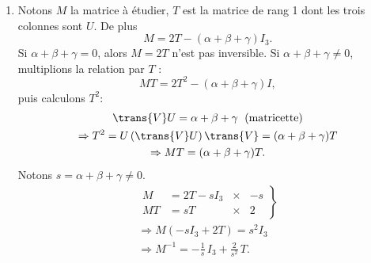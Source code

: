 \begin{enumerate}
 \item Notons $M$ la matrice à étudier, $T$ est la matrice de rang 1 dont les trois colonnes sont $U$. De plus
\[
M = 2 T - (\alpha + \beta + \gamma)I_3.
\]
Si $\alpha + \beta + \gamma =0$, alors $M = 2T$ n'est pas inversible.\newline
Si $\alpha + \beta + \gamma \neq 0$, multiplions la relation par $T$ :
\[
  MT =2T^2 -(\alpha + \beta + \gamma)I,
\]
puis calculons $T^2$:
\begin{multline*}
 \trans{V}U = \alpha + \beta + \gamma \; \text{ (matricette)}\\
 \Rightarrow
T^2 = U\left(\trans{V}U \right) \trans{V} = (\alpha + \beta + \gamma)T  \\
\Rightarrow MT = (\alpha + \beta + \gamma)T.
\end{multline*}
Notons $s=\alpha + \beta + \gamma \neq 0$.
\begin{multline*}
  \left.
  \begin{aligned}
    M  &= 2T - sI_3 &\times& -s\\
    MT &= sT        &\times& 2
  \end{aligned}
\right\rbrace \\
\Rightarrow M \left(-sI_3 + 2T\right) = s^2 I_3\\
\Rightarrow M^{-1} = -\frac{1}{s}\, I_3 + \frac{2}{s^2}\,T.
\end{multline*}

\end{enumerate}


